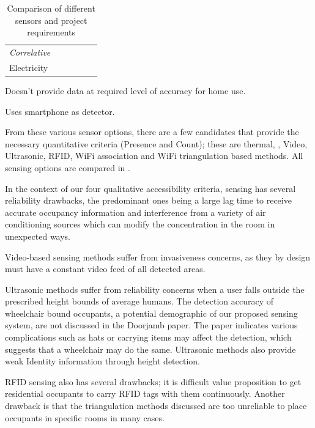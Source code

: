 \documentclass[../thesis/thesis.tex]{subfiles}
\begin{document}
\begin{table}
\begin{threeparttable}
\begin{tabularx}{\textwidth}{|l|l|l||l||l|l|}
\hspace{3mm}\textit{Correlative} 	& & & & & \\
\hspace{8mm}Electricity 		& \cmark\ssup & \xmark & \cmark & & \\

\cline{1-6}
\end{tabularx}
\begin{tablenotes}
\item \ssup  Doesn't provide data at required level of accuracy for home use.
\item \tsup  Uses smartphone as detector.
\end{tablenotes}
\end{threeparttable}
\caption{Comparison of different sensors and project requirements}
\label{tab:litreview:taxonomycomp}
\end{table}

From these various sensor options, there are a few candidates that provide the necessary quantitative criteria (Presence and Count); these are thermal, \cdi, Video, Ultrasonic, RFID, WiFi association and WiFi triangulation based methods. All sensing options are compared in .

In the context of our four qualitative accessibility criteria, \cdi sensing has several reliability drawbacks, the predominant ones being a large lag time to receive accurate occupancy information and interference from a variety of air conditioning sources which can modify the \cdi concentration in the room in unexpected ways.

Video-based sensing methods suffer from invasiveness concerns, as they by design must have a constant video feed of all detected areas.

Ultrasonic methods suffer from reliability concerns when a user falls outside the prescribed height bounds of average humans. The detection accuracy of wheelchair bound occupants, a potential demographic of our proposed sensing system, are not discussed in the Doorjamb paper. The paper indicates various complications such as hats or carrying items may affect the detection, which suggests that a wheelchair may do the same. Ultrasonic methods also provide weak Identity information through height detection.

RFID sensing also has several drawbacks; it is difficult value proposition to get residential occupants to carry RFID tags with them continuously. Another drawback is that the triangulation methods discussed are too unreliable to place occupants in specific rooms in many cases.
\end{document}

